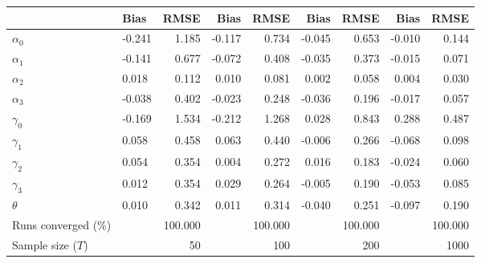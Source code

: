 
\begin{tabular}[t]{llrrrrrrr}
\toprule
  & Bias & RMSE & Bias & RMSE & Bias & RMSE & Bias & RMSE\\
\midrule
$\alpha_{0}$ & -0.241 & 1.185 & -0.117 & 0.734 & -0.045 & 0.653 & -0.010 & 0.144\\
$\alpha_{1}$ & -0.141 & 0.677 & -0.072 & 0.408 & -0.035 & 0.373 & -0.015 & 0.071\\
$\alpha_{2}$ & 0.018 & 0.112 & 0.010 & 0.081 & 0.002 & 0.058 & 0.004 & 0.030\\
$\alpha_{3}$ & -0.038 & 0.402 & -0.023 & 0.248 & -0.036 & 0.196 & -0.017 & 0.057\\
$\gamma_{0}$ & -0.169 & 1.534 & -0.212 & 1.268 & 0.028 & 0.843 & 0.288 & 0.487\\
$\gamma_{1}$ & 0.058 & 0.458 & 0.063 & 0.440 & -0.006 & 0.266 & -0.068 & 0.098\\
$\gamma_{2}$ & 0.054 & 0.354 & 0.004 & 0.272 & 0.016 & 0.183 & -0.024 & 0.060\\
$\gamma_{3}$ & 0.012 & 0.354 & 0.029 & 0.264 & -0.005 & 0.190 & -0.053 & 0.085\\
$\theta$ & 0.010 & 0.342 & 0.011 & 0.314 & -0.040 & 0.251 & -0.097 & 0.190\\
Runs converged (\%) &  & 100.000 &  & 100.000 &  & 100.000 &  & 100.000\\
Sample size ($T$) &  & 50 &  & 100 &  & 200 &  & 1000\\
\bottomrule
\end{tabular}
